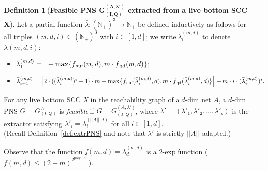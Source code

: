 \documentclass[11pt,a4paper]{amsart}
\newcommand{\nnorm}[1]{||#1||}
\newcommand{\suf}{{}_\textnormal{suf}}
\newcommand{\qd}{{}_\textnormal{qd}}
\newcommand{\Nat}{\mathbb{N}}
\newcommand{\setN}{\Nat}
\theoremstyle{plain}
\theoremstyle{definition}
\newtheorem{defi}[thm]{Definition}
\theoremstyle{defC}
\theoremstyle{thmC}
\begin{document}
\begin{defi}[\textbf{Feasible PNS $\bm{G^{(A,\lambda')}_{(I,Q)}}$ extracted
	from a live bottom SCC $\bm{X}$}]\label{def:feasiblePNS}
	Let a partial function $\bar{\lambda}\colon (\setN_+)^3\to
	\setN_+$ be defined inductively as
	follows for all triples $(m,d,i)\in (\setN_+)^3$ with
	$i\in[1,d]$;
we write $\bar{\lambda}^{(m,d)}_i$ to denote $\bar{\lambda}(m,d,i)$: 
	\begin{itemize}
		\item			
			$\bar{\lambda}^{(m,d)}_1=1+\max\{f\suf(m,d),m\cdot
			f\qd(m,d)\}$;
\item
	$\bar{\lambda}^{(m,d)}_{i+1}=\left[2\cdot((\bar{\lambda}^{(m,d)}_i)^i-1)\cdot
			m+ \max\{f\suf(\bar{\lambda}^{(m,d)}_i,d), m\cdot
			f\qd(\bar{\lambda}^{(m,d)}_i,d)\}\right]+m\cdot
			i\cdot(\bar{\lambda}^{(m,d)}_i)^i.$
	\end{itemize}
For any live bottom SCC $X$ in the reachability graph of
	a $d$-dim net $A$, 
	a $d$-dim PNS $G=G_{(I,Q)}^A$ is \emph{feasible} if 
	$G=G_{(I,Q)}^{(A,\lambda')}$, where
	$\lambda'=(\lambda'_1,\lambda'_2,\dots,\lambda'_d)$ is the extractor satisfying 
	$\lambda'_i=\bar{\lambda}^{(\nnorm{A},d)}_i$ for all
	$i\in[1,d]$. 
	\\
	(Recall Definition~\ref{def:extrPNS} and note that $\lambda'$
	is strictly $\nnorm{A}$-adapted.)
\end{defi}

\noindent
Observe that the function $\bar{f}(m,d)=\bar{\lambda}^{(m,d)}_d$ is a
2-exp function ($\bar{f}(m,d)\leq (2+m)^{2^{\text{poly}(d)}}$).
\end{document}
